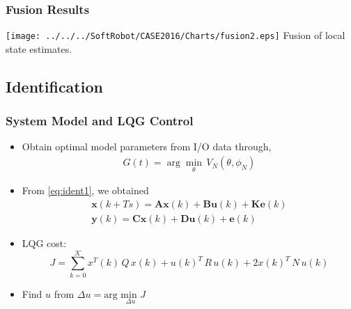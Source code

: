 \begin{frame}
\frametitle{Fusion Results}
	\centering
\texttt{[image: ../../../SoftRobot/CASE2016/Charts/fusion2.eps]}
\small Fusion of local state estimates.
\end{frame}

\subsection{Identification}
\begin{frame}
	\frametitle{System Model and LQG Control}
	\begin{itemize}
		\item Obtain optimal model parameters from I/O data through, 
		\begin{align}
		G(t)= \arg \min_{\theta} \, {V_N(\theta, \phi_N)} \label{eq:ident1} 
		\end{align}
		\item From \eqref{eq:ident1}, we obtained
		\begin{align} \label{eq:statemodel} 	
		\textbf{x}(k+Ts) = \textbf{A} \textbf{x}(k) + \textbf{B} \textbf{u}(k) + \textbf{K} \textbf{e}(k) \nonumber \\
		\textbf{y}(k) = \textbf{C} \textbf{x}(k) + \textbf{D} \textbf{u}(k) + \textbf{e}(k)
		\end{align} 
		\item LQG cost:
		\begin{equation}  \label{eqn:LQ-cost}
		J = \sum\limits_{k=0}^{\mathcal{K}} x^T(k)\,Q\,x(k) +  u(k)^T \, R \, u(k) + 2 x(k)^T \, N \, u(k) \nonumber
		\end{equation}  
		\item Find $u$ from $\Delta u  = \text{arg } \underset{\Delta u}{\text{min }}J $
	\end{itemize}
\end{frame}

